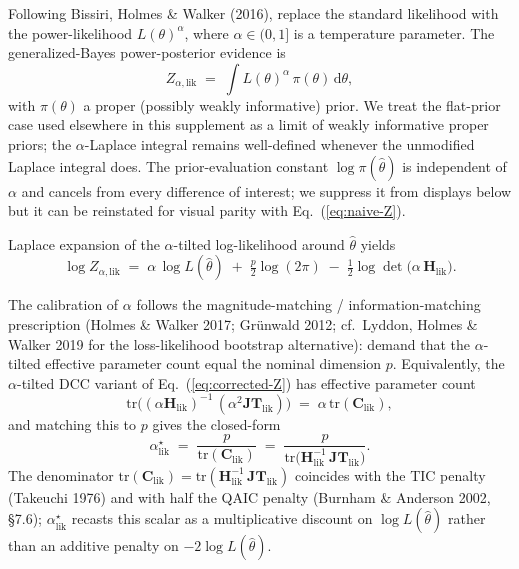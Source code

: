 \documentclass[11pt]{article}
\begin{document}
Following Bissiri, Holmes \& Walker (2016), replace the standard likelihood with the power-likelihood $L(\theta)^\alpha$, where $\alpha \in (0,1]$ is a temperature parameter. The generalized-Bayes power-posterior evidence is
\begin{equation}
Z_{\alpha,\mathrm{lik}}
\;=\;
\int L(\theta)^\alpha\,\pi(\theta)\,\mathrm{d}\theta,
\label{eq:Z-alpha-lik-defn}
\end{equation}
with $\pi(\theta)$ a proper (possibly weakly informative) prior. We treat the flat-prior case used elsewhere in this supplement as a limit of weakly informative proper priors; the $\alpha$-Laplace integral remains well-defined whenever the unmodified Laplace integral does. The prior-evaluation constant $\log\pi(\hat\theta)$ is independent of $\alpha$ and cancels from every difference of interest; we suppress it from displays below but it can be reinstated for visual parity with Eq.~(\ref{eq:naive-Z}).

Laplace expansion of the $\alpha$-tilted log-likelihood around $\hat\theta$ yields
\begin{equation}
\log Z_{\alpha,\mathrm{lik}}
\;=\;
\alpha\,\log L(\hat\theta)
\;+\;
\tfrac{p}{2}\log(2\pi)
\;-\;
\tfrac{1}{2}\log\det\!\bigl(\alpha\,\mathbf H_{\mathrm{lik}}\bigr).
\label{eq:Z-alpha-lik}
\end{equation}

The calibration of $\alpha$ follows the magnitude-matching / information-matching prescription (Holmes \& Walker 2017; Gr\"unwald 2012; cf.\ Lyddon, Holmes \& Walker 2019 for the loss-likelihood bootstrap alternative): demand that the $\alpha$-tilted effective parameter count equal the nominal dimension $p$. Equivalently, the $\alpha$-tilted DCC variant of Eq.~(\ref{eq:corrected-Z}) has effective parameter count
\begin{equation}
\mathrm{tr}\!\bigl((\alpha\mathbf H_{\mathrm{lik}})^{-1}\,(\alpha^2\mathbf{JT}_{\mathrm{lik}})\bigr)
\;=\;
\alpha\,\mathrm{tr}(\mathbf C_{\mathrm{lik}}),
\label{eq:eff-param-count-lik}
\end{equation}
and matching this to $p$ gives the closed-form
\begin{equation}
\boxed{\;
\alpha^\star_{\mathrm{lik}}
\;=\;
\frac{p}{\mathrm{tr}(\mathbf C_{\mathrm{lik}})}
\;=\;
\frac{p}{\mathrm{tr}\!\bigl(\mathbf H_{\mathrm{lik}}^{-1}\,\mathbf{JT}_{\mathrm{lik}}\bigr)}.
\;}
\label{eq:alpha-star-lik}
\end{equation}
The denominator $\mathrm{tr}(\mathbf C_{\mathrm{lik}}) = \mathrm{tr}(\mathbf H_{\mathrm{lik}}^{-1}\,\mathbf{JT}_{\mathrm{lik}})$ coincides with the TIC penalty (Takeuchi 1976) and with half the QAIC penalty (Burnham \& Anderson 2002, \S7.6); $\alpha^\star_{\mathrm{lik}}$ recasts this scalar as a multiplicative discount on $\log L(\hat\theta)$ rather than an additive penalty on $-2\log L(\hat\theta)$.
\end{document}
